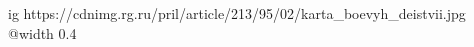  
 
 
 
 

\ifcmt
  ig https://cdnimg.rg.ru/pril/article/213/95/02/karta_boevyh_deistvii.jpg
  @width 0.4
\fi

